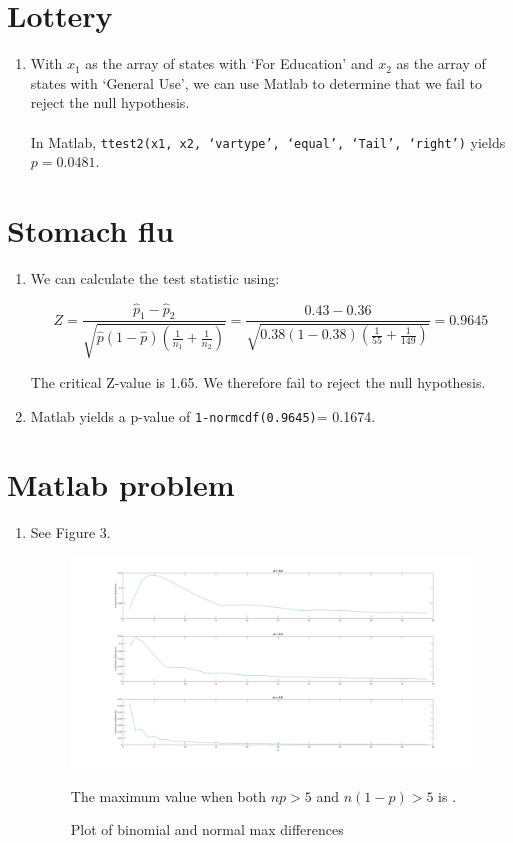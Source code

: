 \documentclass{article}
\begin{document}
\section{Lottery}%
\label{sec:Lottery}
\begin{enumerate}[label=\alph*.]
    \item With $x_1$ as the array of states with `For Education' and $x_2$ as the array of states with `General Use', we can use Matlab to determine that we fail to reject the null hypothesis.\\ \\ 
        In Matlab, \texttt{ttest2(x1, x2, `vartype', `equal', `Tail', `right')} yields $p=0.0481$.
\end{enumerate}

\section{Stomach flu}%
\label{sec:Stomach flu}
\begin{enumerate}[label=\alph*.]
    \item We can calculate the test statistic using:

        $$Z = \frac{\hat{p}_1 - \hat{p}_2}{\sqrt{\hat{p}(1-\hat{p})(\frac{1}{n_1}+\frac{1}{n_2})}} = \frac{0.43 - 0.36}{\sqrt{0.38(1-0.38)(\frac{1}{55}+\frac{1}{149})}}= 0.9645$$

        The critical Z-value is 1.65. We therefore fail to reject the null hypothesis.
    \item Matlab yields a p-value of \texttt{1-normcdf(0.9645)}= 0.1674.
\end{enumerate}

\section{Matlab problem}%
\label{sec:Matlab problem}
\begin{enumerate}[label=\alph*.]
    \item See Figure 3.
\begin{figure}[ht]
\begin{center}
    \includegraphics[scale=0.29]{fig2}
    \caption{Plot of binomial and normal max differences}

\end{center}
The maximum value when both $np>5$ and $n(1-p)>5$ is .
\end{figure}
\end{enumerate}


\end{document}
